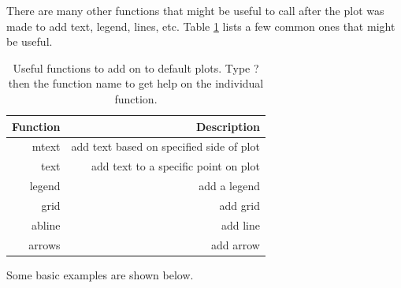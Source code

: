 \documentclass[a4paper,11pt]{article}\usepackage{graphicx, color}
\begin{document}
There are many other functions that might be useful to call after the plot was made to add text, legend, lines, etc. Table \ref{table:addOns} lists a few common ones that might be useful.

\begin{table}[ht]
\centering
\begin{tabular}{rr}
  \hline
Function & Description  \\ 
  \hline
mtext & add text based on specified side of plot\\
text & add text to a specific point on plot\\
legend & add a legend \\ 
grid & add grid\\ 
abline & add line \\
arrows & add arrow \\ 
   \hline
\end{tabular}
\caption{Useful functions to add on to default plots. Type ? then the function name to get help on the individual function.} 
\label{table:addOns}
\end{table}

Some basic examples are shown below.
\end{document}
